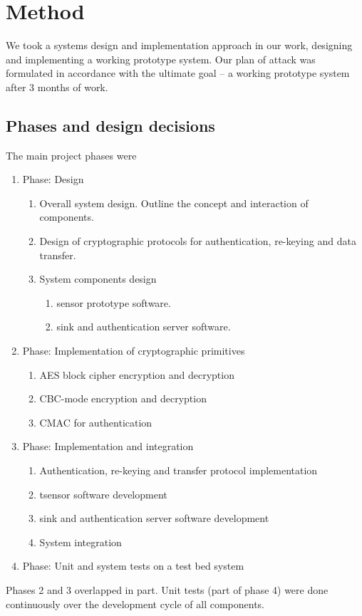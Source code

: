 \chapter{Method}

We took a systems design and implementation approach in our work, designing and implementing a working prototype system. Our plan of attack was formulated in accordance with the ultimate goal -- a working prototype system after 3 months of work. 

\section{Phases and design decisions}

The main project phases were
%
\begin{enumerate}

\item Phase: Design
\begin{enumerate}
\item Overall system design. Outline the concept and interaction of components.
\item Design of cryptographic protocols for authentication, re-keying and data transfer.
\item System components design
\begin{enumerate}
\item sensor prototype software.
\item sink and authentication server software.
\end{enumerate}
\end{enumerate}

\item Phase: Implementation of cryptographic primitives
\begin{enumerate}
\item AES block cipher encryption and decryption
\item CBC-mode encryption and decryption
\item CMAC for authentication
\end{enumerate}

\item Phase: Implementation and integration
\begin{enumerate}
\item Authentication, re-keying and transfer protocol implementation
\item tsensor software development
\item sink and authentication server software development
\item System integration
\end{enumerate}

\item Phase: Unit and system tests on a test bed system

\end{enumerate}
%
Phases 2 and 3 overlapped in part. Unit tests (part of phase 4) were done continuously over the development cycle of all components.


